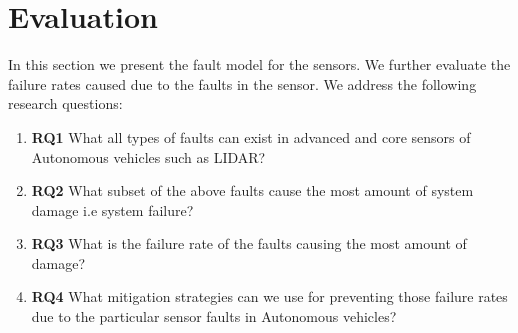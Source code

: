 \section{Evaluation}
In this section we present the fault model for the sensors. We further evaluate the failure rates caused due to the faults in the sensor. We address the following research questions:
\begin{enumerate}
	\item \textbf{RQ1}
	What all types of faults can exist in advanced and core sensors of Autonomous vehicles such as LIDAR?
	\item \textbf{RQ2}
	What subset of the above faults cause the most amount of system damage i.e system failure?
	\item \textbf{RQ3}
	What is the failure rate of the faults causing the most amount of damage?
	\item \textbf{RQ4}
	What mitigation strategies can we use for preventing those failure rates due to the particular sensor faults in Autonomous vehicles?
\end{enumerate}